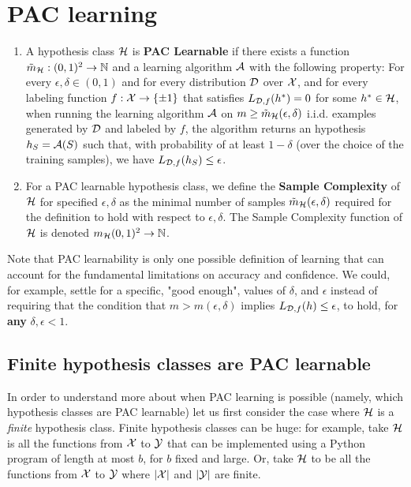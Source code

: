 {\section{PAC learning}
\begin{definition}
	\begin{enumerate}
		\item
		A hypothesis class $\mathcal{H}$ is {\bf PAC Learnable} if there exists a function $\tilde{m}_{\mathcal{H}} : (0,1)^2 \to \mathbb{N}$ and a learning algorithm $\mathcal{A}$ with the following property:
		For every $\epsilon,\delta \in (0,1)$ and for every distribution $\mathcal{D}$ over $\mathcal{X}$, and for every labeling function 
		$f:\mathcal{X}\to\{\pm 1\}$ that satisfies $L_{\mathcal{D},f}(h^*)=0$ for some $h^*\in\mathcal{H}$, when running the learning algorithm $\mathcal{A}$ on $m\ge \tilde{m}_{\mathcal{H}}(\epsilon,\delta)$ i.i.d. examples generated by $\mathcal{D}$ and labeled by $f$, the algorithm returns an hypothesis $h_S=\mathcal{A}(S)$ such that, with probability of at least $1-\delta$ (over the choice of the training samples), we have
		$
		L_{\mathcal{D}, f}(h_S) \le \epsilon
		$. 
		\item For a PAC learnable hypothesis class, we define the {\bf Sample Complexity} of $\mathcal{H}$ for specified $\epsilon,\delta$ as the minimal number of samples $\tilde{m}_{\mathcal{H}}(\epsilon,\delta)$ required for the definition to hold with respect to $\epsilon,\delta$. The Sample Complexity function of $\mathcal{H}$ is denoted $m_{\mathcal{H}}(0,1)^2\to\mathbb{N}$.
	\end{enumerate}
\end{definition}

Note that  PAC learnability is only one possible definition of learning that can account for the fundamental limitations on accuracy and confidence. We could, for example, settle for a specific, "good enough", values of $\delta$,  and $\epsilon$ instead of requiring that the condition that $m > m(\epsilon, \delta)$ implies  $L_{\mathcal{D}, f}(h) \le \epsilon$, to hold, for {\bf any} $\delta, \epsilon <1$.

\subsection{Finite hypothesis classes are PAC learnable}

In order to understand more about when PAC learning is possible (namely, which hypothesis classes are PAC learnable) let us first consider the case where $\mathcal{H}$ is a \textit{finite} hypothesis class.
Finite hypothesis classes can be huge: for example, take $\mathcal{H}$ is all the functions from $\mathcal{X}$ to $\mathcal{Y}$ that can be implemented using a Python program of length at most $b$, for $b$ fixed and large. Or, take $\mathcal{H}$ to be all the functions from $\mathcal{X}$ to $\mathcal{Y}$ where  $|\mathcal{X}|$ and $|\mathcal{Y}|$ are finite.

}
